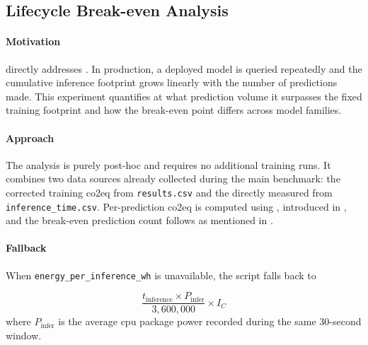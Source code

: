 \subsection{Lifecycle Break-even Analysis}
\label{design_lifecycle}\label{exp:5}

\paragraph{Motivation}
 directly addresses . In production, a deployed model is queried repeatedly and the cumulative inference footprint grows linearly with the number of predictions made. This experiment quantifies at what prediction volume it surpasses the fixed training footprint and how the break-even point differs across model families.

\paragraph{Approach}
The analysis is purely post-hoc and requires no additional training runs. It combines two data sources already collected during the main benchmark: the corrected training \gls{co2eq} from \texttt{results.csv} and the directly measured  from \texttt{inference\_time.csv}. Per-prediction \gls{co2eq} is computed using , introduced in , and the break-even prediction count follows as mentioned in .

\paragraph{Fallback}
When \texttt{energy\_per\_inference\_wh} is unavailable, the script falls back to

\begin{equation}
\frac{t_{\text{inference}} \times P_{\text{infer}}}{3{,}600{,}000} \times I_C
\end{equation}
where $P_{\text{infer}}$ is the average \gls{cpu} package power recorded during the same 30-second window.
